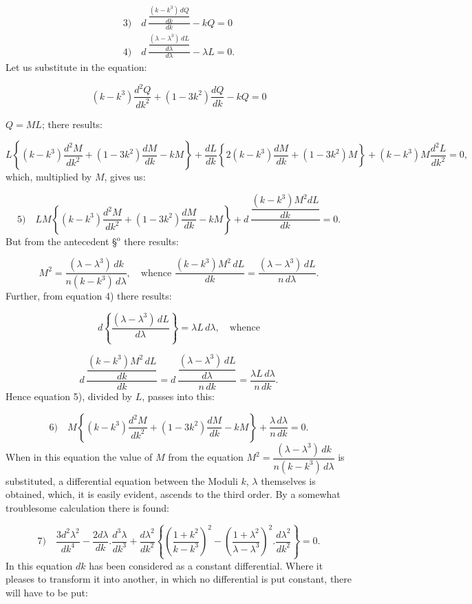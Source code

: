 \documentclass{article}
\begin{document}
\[
\begin{gathered}
\text{3)}\quad d\,\frac{\dfrac{(k-k^{3})\,dQ}{dk}}{dk}-kQ=0\\[2ex]
\text{4)}\quad d\,\frac{\dfrac{(\lambda-\lambda^{3})\,dL}{d\lambda}}{d\lambda}-\lambda L=0.
\end{gathered}
\]
Let us substitute in the equation:

\[
(k-k^{3})\frac{d^{2}Q}{dk^{2}}+(1-3k^{2})\frac{dQ}{dk}-kQ=0
\]

$Q=ML$; there results:

\[
L\left\{(k-k^{3})\frac{d^{2}M}{dk^{2}}+(1-3k^{2})\frac{dM}{dk}-kM\right\}+\frac{dL}{dk}\left\{2(k-k^{3})\frac{dM}{dk}+(1-3k^{2})M\right\}+(k-k^{3})M\frac{d^{2}L}{dk^{2}}=0,
\]
which, multiplied by $M$, gives us:

\[
\text{5)}\quad LM\left\{(k-k^{3})\frac{d^{2}M}{dk^{2}}+(1-3k^{2})\frac{dM}{dk}-kM\right\}+d\,\frac{\dfrac{(k-k^{3})M^{2}dL}{dk}}{dk}=0.
\]
But from the antecedent §$^{\mathrm{o}}$ there results:

\[
M^{2}=\frac{(\lambda-\lambda^{3})\,dk}{n(k-k^{3})\,d\lambda},\quad\text{whence }\frac{(k-k^{3})M^{2}\,dL}{dk}=\frac{(\lambda-\lambda^{3})\,dL}{n\,d\lambda}.
\]
Further, from equation 4) there results:

\[
d\left\{\frac{(\lambda-\lambda^{3})\,dL}{d\lambda}\right\}=\lambda L\,d\lambda,\quad\text{whence}
\]

\[
d\,\frac{\dfrac{(k-k^{3})M^{2}\,dL}{dk}}{dk}=d\,\frac{\dfrac{(\lambda-\lambda^{3})\,dL}{d\lambda}}{n\,dk}=\frac{\lambda L\,d\lambda}{n\,dk}.
\]
Hence equation 5), divided by $L$, passes into this:

\[
\text{6)}\quad M\left\{(k-k^{3})\frac{d^{2}M}{dk^{2}}+(1-3k^{2})\frac{dM}{dk}-kM\right\}+\frac{\lambda\,d\lambda}{n\,dk}=0.
\]
When in this equation the value of $M$ from the equation $M^{2}=\dfrac{(\lambda-\lambda^{3})\,dk}{n(k-k^{3})\,d\lambda}$ is substituted, a differential equation between the Moduli $k$, $\lambda$ themselves is obtained, which, it is easily evident, ascends to the third order. By a somewhat troublesome calculation there is found:

\[
\text{7)}\quad\frac{3d^{2}\lambda^{2}}{dk^{4}}-\frac{2d\lambda}{dk}.\frac{d^{3}\lambda}{dk^{3}}+\frac{d\lambda^{2}}{dk^{2}}\left\{\left(\frac{1+k^{2}}{k-k^{3}}\right)^{2}-\left(\frac{1+\lambda^{2}}{\lambda-\lambda^{3}}\right)^{2}.\frac{d\lambda^{2}}{dk^{2}}\right\}=0.
\]
In this equation $dk$ has been considered as a constant differential. Where it pleases to transform it into another, in which no differential is put constant, there will have to be put:
\end{document}
